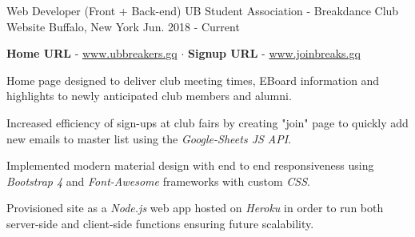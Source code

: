 

\begin{cventries}

 \cventry
    {Web Developer (Front + Back-end)} %
    {UB Student Association - Breakdance Club Website} %
    {Buffalo, New York} %
    {Jun. 2018 - Current} %
    {
      \begin{cvitems} %
      {\textbf{Home URL}   -  \href{www.ubbreakers.gq}{www.ubbreakers.gq} $\cdot$ \textbf{Signup URL} - \href{www.joinbreaks.gq}{www.joinbreaks.gq}}
        \item
        \item {Home page designed to deliver club meeting times, EBoard information and highlights to newly anticipated club members and alumni.}
        \item {Increased efficiency of sign-ups at club fairs by creating "join" page to quickly add new emails  to master list using the \textit{Google-Sheets JS API}.}
        \item {Implemented modern material design with end to end responsiveness using \textit{Bootstrap 4} and \textit{Font-Awesome} frameworks with custom \textit{CSS}.}
        \item {Provisioned site as a \textit{Node.js} web app hosted on \textit{Heroku} in order to run both server-side and client-side functions ensuring future scalability.}
      \end{cvitems}
    }
    

\end{cventries}
